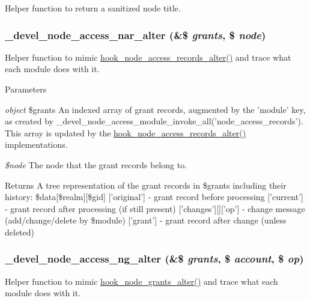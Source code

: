 \label{devel__node__access_8module_aae8673d182a87acb3b8039decbe5fb4f}
Helper function to return a sanitized node title. \hypertarget{devel__node__access_8module_a4e53f1761aae77265e0b5fecfef17875}{
\subsubsection[{\_\-devel\_\-node\_\-access\_\-nar\_\-alter}]{\setlength{\rightskip}{0pt plus 5cm}\_\-devel\_\-node\_\-access\_\-nar\_\-alter (\&\$ {\em grants}, \/  \$ {\em node})}}
\label{devel__node__access_8module_a4e53f1761aae77265e0b5fecfef17875}
Helper function to mimic \hyperlink{group__node__access_ga37c90bf0e1dccad0deefa368dd94cc83}{hook\_\-node\_\-access\_\-records\_\-alter()} and trace what each module does with it.


\begin{DoxyParams}{Parameters}
\item[{\em object}]\$grants An indexed array of grant records, augmented by the 'module' key, as created by \_\-devel\_\-node\_\-access\_\-module\_\-invoke\_\-all('node\_\-access\_\-records'). This array is updated by the \hyperlink{group__node__access_ga37c90bf0e1dccad0deefa368dd94cc83}{hook\_\-node\_\-access\_\-records\_\-alter()} implementations.\item[{\em \$node}]The node that the grant records belong to.\end{DoxyParams}
\begin{DoxyReturn}{Returns}
A tree representation of the grant records in \$grants including their history: \$data\mbox{[}\$realm\mbox{]}\mbox{[}\$gid\mbox{]} \mbox{[}'original'\mbox{]} -\/ grant record before processing \mbox{[}'current'\mbox{]} -\/ grant record after processing (if still present) \mbox{[}'changes'\mbox{]}\mbox{[}\mbox{]}\mbox{[}'op'\mbox{]} -\/ change message (add/change/delete by \$module) \mbox{[}'grant'\mbox{]} -\/ grant record after change (unless deleted) 
\end{DoxyReturn}
\hypertarget{devel__node__access_8module_a00d150a03a2dfbbe199be12f0c49f738}{
\subsubsection[{\_\-devel\_\-node\_\-access\_\-ng\_\-alter}]{\setlength{\rightskip}{0pt plus 5cm}\_\-devel\_\-node\_\-access\_\-ng\_\-alter (\&\$ {\em grants}, \/  \$ {\em account}, \/  \$ {\em op})}}
\label{devel__node__access_8module_a00d150a03a2dfbbe199be12f0c49f738}
Helper function to mimic \hyperlink{group__node__access_ga21e95e2bd0b4ed12d861aa83426a8ba3}{hook\_\-node\_\-grants\_\-alter()} and trace what each module does with it.


